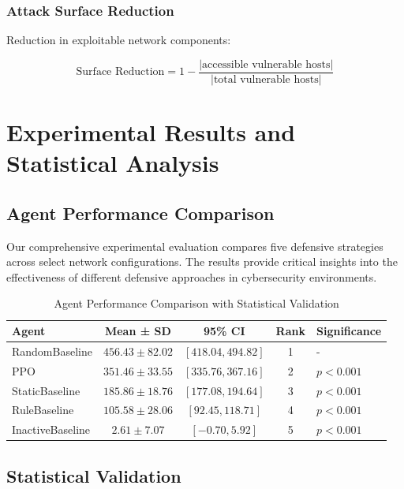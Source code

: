 \documentclass[12pt,oneside]{article}
\begin{document}
\subsubsection{Attack Surface Reduction}
Reduction in exploitable network components:

\begin{equation}
\text{Surface Reduction} = 1 - \frac{|\text{accessible vulnerable hosts}|}{|\text{total vulnerable hosts}|}
\end{equation}

\section{Experimental Results and Statistical Analysis}

\subsection{Agent Performance Comparison}

Our comprehensive experimental evaluation compares five defensive strategies across select network configurations. The results provide critical insights into the effectiveness of different defensive approaches in cybersecurity environments.

\begin{table}[H]
\centering
\caption{Agent Performance Comparison with Statistical Validation}
\label{tab:agent_performance}
\begin{tabular}{lcccl}
\toprule
\textbf{Agent} & \textbf{Mean ± SD} & \textbf{95\% CI} & \textbf{Rank} & \textbf{Significance} \\
\midrule
RandomBaseline & $456.43 \pm 82.02$ & $[418.04, 494.82]$ & 1 & - \\
PPO & $351.46 \pm 33.55$ & $[335.76, 367.16]$ & 2 & $p < 0.001$ \\
StaticBaseline & $185.86 \pm 18.76$ & $[177.08, 194.64]$ & 3 & $p < 0.001$ \\
RuleBaseline & $105.58 \pm 28.06$ & $[92.45, 118.71]$ & 4 & $p < 0.001$ \\
InactiveBaseline & $2.61 \pm 7.07$ & $[-0.70, 5.92]$ & 5 & $p < 0.001$ \\
\bottomrule
\end{tabular}
\end{table}

\subsection{Statistical Validation}
\end{document}
